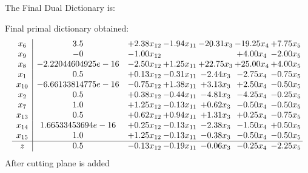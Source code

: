 \documentclass[8pt]{article}
\begin{document}
The Final Dual Dictionary is: 

 Final primal dictionary obtained: 
\[\begin{array}{c| c c@{\hskip 2pt} c@{\hskip 2pt} c@{\hskip 2pt} c@{\hskip 2pt} c@{\hskip 2pt} }
 x_{6}   &  3.5 & +  2.38 x_{12} & -1.94 x_{11} & -20.31 x_{3} & -19.25 x_{4} & +  7.75 x_{5}\\
 x_{9}   &  -0 & -1.00 x_{12} &    &   & +  4.00 x_{4} & -2.00 x_{5}\\
 x_{8}   &  -2.22044604925e-16 & -2.50 x_{12} & +  1.25 x_{11} & + 22.75 x_{3} & + 25.00 x_{4} & +  4.00 x_{5}\\
 x_{1}   &  0.5 & +  0.13 x_{12} & -0.31 x_{11} & -2.44 x_{3} & -2.75 x_{4} & -0.75 x_{5}\\
 x_{10}   &  -6.66133814775e-16 & -0.75 x_{12} & +  1.38 x_{11} & +  3.13 x_{3} & +  2.50 x_{4} & -0.50 x_{5}\\
 x_{2}   &  0.5 & +  0.38 x_{12} & -0.44 x_{11} & -4.81 x_{3} & -4.25 x_{4} & -0.25 x_{5}\\
 x_{7}   &  1.0 & +  1.25 x_{12} & -0.13 x_{11} & +  0.62 x_{3} & -0.50 x_{4} & -0.50 x_{5}\\
 x_{13}   &  0.5 & +  0.62 x_{12} & +  0.94 x_{11} & +  1.31 x_{3} & +  0.25 x_{4} & -0.75 x_{5}\\
 x_{14}   &  1.66533453694e-16 & +  0.25 x_{12} & -0.13 x_{11} & -2.38 x_{3} & -1.50 x_{4} & +  0.50 x_{5}\\
 x_{15}   &  1.0 & +  1.25 x_{12} & -0.13 x_{11} & -0.38 x_{3} & -0.50 x_{4} & -0.50 x_{5}\\
\hline
z    &  0.5 & -0.13 x_{12} & -0.19 x_{11} & -0.06 x_{3} & -0.25 x_{4} & -2.25 x_{5}\\
\end{array}\]
 After cutting plane is added 
\end{document}
